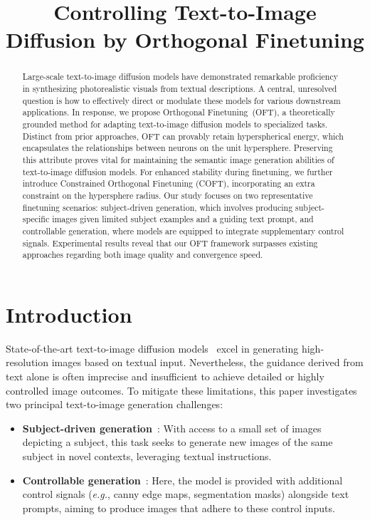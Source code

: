 \title{Controlling Text-to-Image Diffusion by Orthogonal Finetuning}

\begin{abstract}
Large-scale text-to-image diffusion models have demonstrated remarkable proficiency in synthesizing photorealistic visuals from textual descriptions. A central, unresolved question is how to effectively direct or modulate these models for various downstream applications. In response, we propose Orthogonal Finetuning~(OFT), a theoretically grounded method for adapting text-to-image diffusion models to specialized tasks. Distinct from prior approaches, OFT can provably retain hyperspherical energy, which encapsulates the relationships between neurons on the unit hypersphere. Preserving this attribute proves vital for maintaining the semantic image generation abilities of text-to-image diffusion models. For enhanced stability during finetuning, we further introduce Constrained Orthogonal Finetuning (COFT), incorporating an extra constraint on the hypersphere radius. Our study focuses on two representative finetuning scenarios: subject-driven generation, which involves producing subject-specific images given limited subject examples and a guiding text prompt, and controllable generation, where models are equipped to integrate supplementary control signals. Experimental results reveal that our OFT framework surpasses existing approaches regarding both image quality and convergence speed.
\end{abstract}

\section{Introduction}

State-of-the-art text-to-image diffusion models~\cite{saharia2022photorealistic,ramesh2022hierarchical,rombach2022high} excel in generating high-resolution images based on textual input. Nevertheless, the guidance derived from text alone is often imprecise and insufficient to achieve detailed or highly controlled image outcomes. To mitigate these limitations, this paper investigates two principal text-to-image generation challenges:

\begin{itemize}[leftmargin=*,nosep]

    \item \textbf{Subject-driven generation}~\cite{ruiz2023dreambooth}: With access to a small set of images depicting a subject, this task seeks to generate new images of the same subject in novel contexts, leveraging textual instructions.
    \item \textbf{Controllable generation}~\cite{zhang2023adding,mou2023t2i}: Here, the model is provided with additional control signals (\emph{e.g.}, canny edge maps, segmentation masks) alongside text prompts, aiming to produce images that adhere to these control inputs.
\end{itemize}

